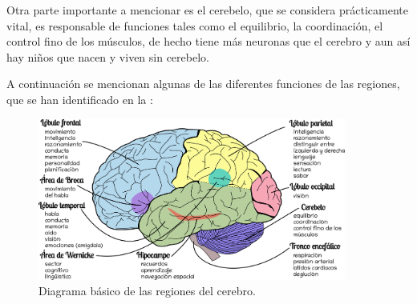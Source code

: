 Otra parte importante a mencionar es el cerebelo, que se considera prácticamente vital, es responsable de funciones tales como el equilibrio, la coordinación, el control fino de los músculos, de hecho tiene más neuronas que el cerebro y aun así hay niños que nacen y viven sin cerebelo. 




A continuación se mencionan algunas de las diferentes funciones de las regiones, que se han identificado en la : 


 \begin{figure}[h]
  \centering
  \includegraphics[width=0.9\textwidth]{../Figuras/cerebro.png}
  \caption{Diagrama básico de las regiones del cerebro.}\label{cerebro}
 \end{figure}


